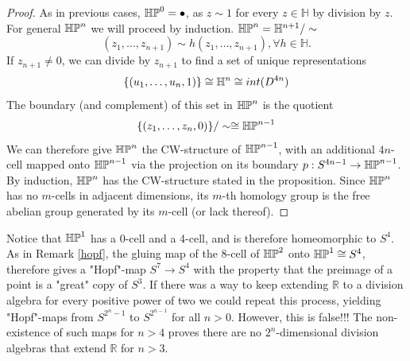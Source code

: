 \begin{proof}
As in previous cases, $\mathbb{HP}^{0}=\bullet$, as $z\sim 1$ for every $z\in \mathbb{H}$ by division by $z$. For general $\mathbb{HP}^{n}$ we will proceed by induction. $\mathbb{HP}^{n}=\mathbb{H}^{n+1}/\sim$
$$(z_1,\dots,z_{n+1})\sim h(z_1,\dots,z_{n+1}), \forall h\in \mathbb{H}.$$
If $z_{n+1}\neq 0$, we can divide by $z_{n+1}$ to find a set of unique representations
$$\{(u_1,\dots,u_n,1)\}\cong \mathbb{H}^n\cong int(D^{4n})$$
The boundary (and complement) of this set in $\mathbb{HP}^{n}$ is the quotient 
$$\{(z_1,\dots,z_n,0)\}/\sim \cong \mathbb{HP}^{n-1}$$
We can therefore give $\mathbb{HP}^{n}$ the CW-structure of $\mathbb{HP}^{n-1}$, with an additional $4n$-cell mapped onto $\mathbb{HP}^{n-1}$ via the projection on its boundary $p:S^{4n-1}\rightarrow \mathbb{HP}^{n-1}$. By induction, $\mathbb{HP}^{n}$ has the CW-structure stated in the proposition. Since $\mathbb{HP}^{n}$ has no $m$-cells in adjacent dimensions, its $m$-th homology group is the free abelian group generated by its $m$-cell (or lack thereof).
\end{proof}

\begin{remark}
Notice that $\mathbb{HP}^{1}$ has a 0-cell and a 4-cell, and is therefore homeomorphic to $S^{4}$. As in Remark \ref{hopf}, the gluing map of the 8-cell of $\mathbb{HP}^{2}$ onto $\mathbb{HP}^{1}\cong S^{4}$, therefore gives a "Hopf"-map $S^7\rightarrow S^4$ with the property that the preimage of a point is a "great" copy of $S^3$. If there was a way to keep extending $\mathbb{R}$ to a division algebra for every positive power of two we could repeat this process, yielding "Hopf"-maps from $S^{2^n-1}$ to $S^{2^{n-1}}$ for all $n>0$. However, this is false!!! The non-existence of such maps for $n>4$ proves there are no $2^n$-dimensional division algebras that extend $\mathbb{R}$ for $n>3$.
\end{remark}